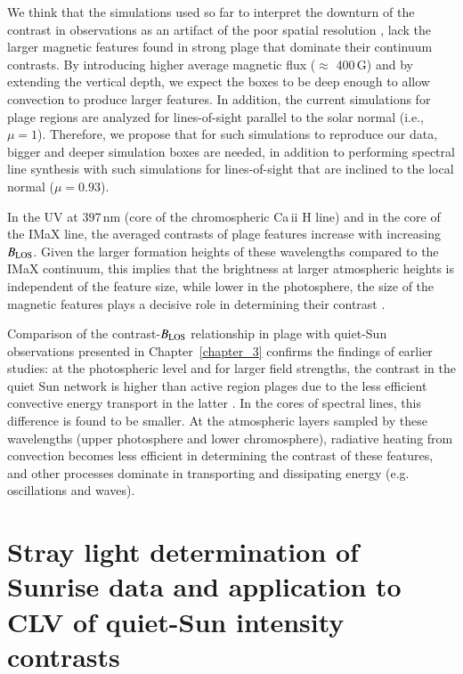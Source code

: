 \documentclass[goettingen, gauss, print]{thesis}
\begin{document}
We think that the simulations used so far to interpret the downturn of the contrast in observations as an artifact of the poor spatial resolution \citep{rohrbein_is_2011, danilovic_relation_2013}, lack the larger magnetic features found in strong plage that dominate their continuum contrasts. By introducing higher average magnetic flux ($\approx$ 400\,G) and by extending the vertical depth, we expect the boxes to be deep enough to allow convection to produce larger features. In addition, the current simulations for plage regions are analyzed for lines-of-sight parallel to the solar normal (i.e., $\mu=1$). Therefore, we propose that for such simulations to reproduce our data, bigger and deeper simulation boxes are needed, in addition to performing spectral line synthesis with such simulations for lines-of-sight that are inclined to the local normal ($\mu=0.93$).

In the UV at 397\,nm (core of the chromospheric Ca\,{\sc ii} H line) and in the core of the IMaX line, the averaged contrasts of plage features increase with increasing $B_{\rm LOS}$. Given the larger formation heights of these wavelengths compared to the IMaX continuum, this implies that the brightness at larger atmospheric heights is independent of the feature size, while lower in the photosphere, the size of the magnetic features plays a decisive role in determining their contrast \citep{solanki_small-scale_2001}.  

Comparison of the contrast-$B_{\rm LOS}$ relationship in plage with quiet-Sun observations presented in Chapter~\ref{chapter_3} confirms the findings of earlier studies: at the photospheric level and for larger field strengths, the contrast in the quiet Sun network is higher than active region plages \citep{title_differences_1992, morinaga_suppression_2008, kobel_continuum_2011} due to the less efficient convective energy transport in the latter \citep{morinaga_suppression_2008, kobel_continuum_2012,criscuoli_comparison_2013}. In the cores of spectral lines, this difference is found to be smaller. At the atmospheric layers sampled by these wavelengths (upper photosphere and lower chromosphere), radiative heating from convection becomes less efficient in determining the contrast of these features, and other processes dominate in transporting and dissipating energy (e.g. oscillations and waves). 


\chapter{Stray light determination of Sunrise data and application to CLV of quiet-Sun intensity contrasts}
\end{document}
